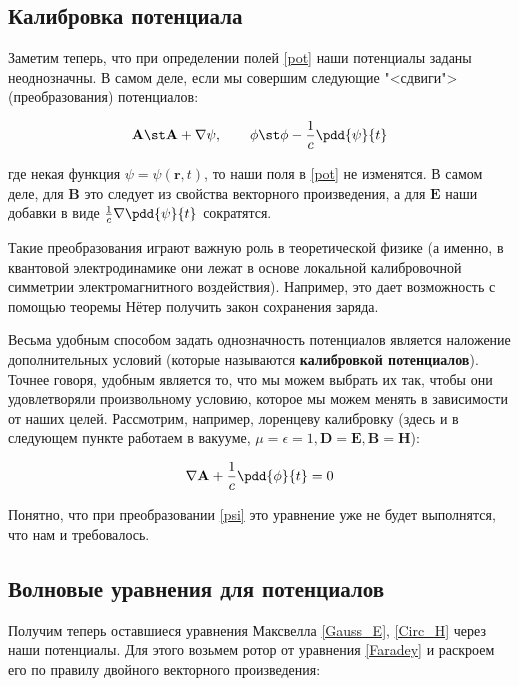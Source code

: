\documentclass[12pt]{kiarticle}
\begin{document}
\subsection{Калибровка потенциала}

Заметим теперь, что при определении полей \eqref{pot} наши потенциалы заданы неоднозначны. В самом деле, если мы совершим следующие "<сдвиги"> (преобразования) потенциалов: 

\begin{equation}\label{psi}
\mathbf{A} \st \mathbf{A} + \nabla \psi, \qquad \phi \st \phi - \dfrac{1}{c} \pdd{\psi}{t}
\end{equation}

где некая функция $ \psi = \psi(\mathbf{r}, t) $, то наши поля в \eqref{pot} не изменятся. В самом деле, для $ \mathbf{B}  $ это следует из свойства векторного произведения, а для $ \mathbf{E} $ наши добавки в виде $ \frac{1}{c} \nabla \pdd{\psi}{t} $ сократятся. 

Такие преобразования играют важную роль в теоретической физике (а именно, в квантовой электродинамике они лежат в основе локальной калибровочной симметрии электромагнитного воздействия). Например, это дает возможность с помощью теоремы Нётер получить закон сохранения заряда. 

Весьма удобным способом задать однозначность потенциалов является наложение дополнительных условий (которые называются \textbf{калибровкой потенциалов}). Точнее говоря, удобным является то, что мы можем выбрать их так, чтобы они удовлетворяли произвольному условию, которое мы можем менять в зависимости от наших целей. Рассмотрим, например, лоренцеву калибровку (здесь и в следующем пункте работаем в вакууме, $ \mu = \epsilon = 1, \mathbf{D} = \mathbf{E}, \mathbf{B} = \mathbf{H} $): 

\begin{equation}\label{Lorents}
\nabla \mathbf{A}+ \dfrac{1}{c} \pdd{\phi}{t} = 0
\end{equation}

Понятно, что при преобразовании \eqref{psi} это уравнение уже не будет выполнятся, что нам и требовалось.



\subsection{Волновые уравнения для потенциалов}

Получим теперь оставшиеся уравнения Максвелла \eqref{Gauss_E}, \eqref{Circ_H} через наши потенциалы. Для этого возьмем ротор от уравнения \eqref{Faradey} и раскроем его по правилу двойного векторного произведения:
\end{document}

